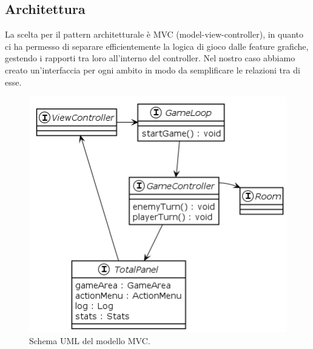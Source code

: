 \documentclass[a4paper,titlepage,12pt]{article}
\begin{document}
\subsection{Architettura}
La scelta per il pattern architetturale è MVC (model-view-controller), in quanto ci ha permesso di separare efficientemente la logica di gioco dalle feature grafiche, gestendo i rapporti tra loro all'interno del controller. 
Nel nostro caso abbiamo creato un'interfaccia per ogni ambito in modo da semplificare le relazioni tra di esse.

\begin{figure}[H]
    \centering
    \includegraphics[scale=0.8]{img/uml/MVC.png}
    \caption{Schema UML del modello MVC.}
    \label{img:model}
\end{figure}
\end{document}
